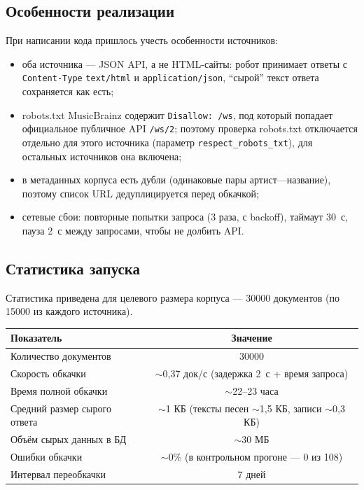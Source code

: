 \subsection{Особенности реализации}
При написании кода пришлось учесть особенности источников:

\begin{itemize}
    \item оба источника --- JSON API, а не HTML-сайты: робот принимает ответы
    с \texttt{Content-Type} \texttt{text/html} и \texttt{application/json},
    \enquote{сырой} текст ответа сохраняется как есть;
    \item robots.txt MusicBrainz содержит \texttt{Disallow: /ws}, под который
    попадает официальное публичное API \texttt{/ws/2}; поэтому проверка
    robots.txt отключается отдельно для этого источника (параметр
    \texttt{respect\_robots\_txt}), для остальных источников она включена;
    \item в метаданных корпуса есть дубли (одинаковые пары артист---название),
    поэтому список URL дедуплицируется перед обкачкой;
    \item сетевые сбои: повторные попытки запроса (3 раза, с backoff), таймаут
    30~с, пауза 2~с между запросами, чтобы не долбить API.
\end{itemize}

\subsection{Статистика запуска}
Статистика приведена для целевого размера корпуса --- 30000 документов (по
15000 из каждого источника).

\begin{tabular}{|l|c|}
\hline
Показатель & Значение \\ \hline
Количество документов & 30000 \\ \hline
Скорость обкачки & $\sim$0{,}37 док/с (задержка 2~с + время запроса) \\ \hline
Время полной обкачки & $\sim$22--23 часа \\ \hline
Средний размер сырого ответа & $\sim$1 КБ (тексты песен $\sim$1{,}5 КБ,
записи $\sim$0{,}3 КБ) \\ \hline
Объём сырых данных в БД & $\sim$30 МБ \\ \hline
Ошибки обкачки & $\sim$0\% (в контрольном прогоне --- 0 из 108) \\ \hline
Интервал переобкачки & 7 дней \\ \hline
\end{tabular}

